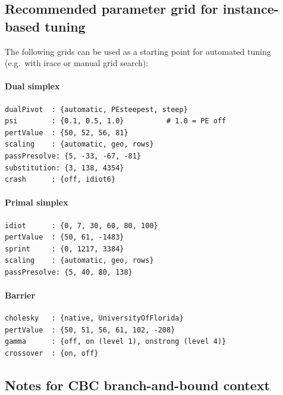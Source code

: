 \documentclass[11pt,a4paper]{article}
\begin{document}
\subsection{Recommended parameter grid for instance-based tuning}

The following grids can be used as a starting point for automated tuning
(e.g.\ with irace or manual grid search):

\paragraph{Dual simplex}
\begin{lstlisting}
dualPivot  : {automatic, PEsteepest, steep}
psi        : {0.1, 0.5, 1.0}          # 1.0 = PE off
pertValue  : {50, 52, 56, 81}
scaling    : {automatic, geo, rows}
passPresolve: {5, -33, -67, -81}
substitution: {3, 138, 4354}
crash      : {off, idiot6}
\end{lstlisting}

\paragraph{Primal simplex}
\begin{lstlisting}
idiot      : {0, 7, 30, 60, 80, 100}
pertValue  : {50, 61, -1483}
sprint     : {0, 1217, 3384}
scaling    : {automatic, geo, rows}
passPresolve: {5, 40, 80, 138}
\end{lstlisting}

\paragraph{Barrier}
\begin{lstlisting}
cholesky   : {native, UniversityOfFlorida}
pertValue  : {50, 51, 56, 61, 102, -208}
gamma      : {off, on (level 1), onstrong (level 4)}
crossover  : {on, off}
\end{lstlisting}

\subsection{Notes for CBC branch-and-bound context}
\end{document}

